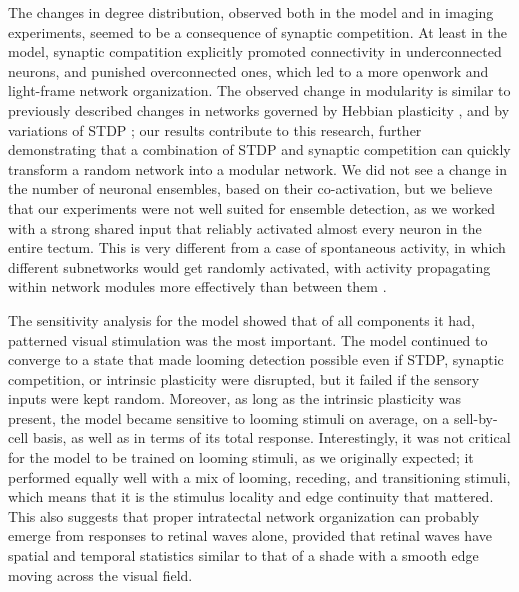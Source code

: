 \documentclass{article}
\begin{document}
The changes in degree distribution, observed both in the model and in imaging experiments, seemed to be a consequence of synaptic competition. At least in the model, synaptic compatition explicitly promoted connectivity in underconnected neurons, and punished overconnected ones, which led to a more openwork and light-frame network organization. The observed change in modularity is similar to previously described changes in networks governed by Hebbian plasticity \citep{triplett2018emergence,damicelli2018topomod}, and by variations of STDP \citep{stam2010modular}; our results contribute to this research, further demonstrating that a combination of STDP and synaptic competition can quickly transform a random network into a modular network. We did not see a change in the number of neuronal ensembles, based on their co-activation, but we believe that our experiments were not well suited for ensemble detection, as we worked with a strong shared input that reliably activated almost every neuron in the entire tectum. This is very different from a case of spontaneous activity, in which different subnetworks would get randomly activated, with activity propagating within network modules more effectively than between them \citep{avitan2017spontaneous}.

The sensitivity analysis for the model showed that of all components it had, patterned visual stimulation was the most important. The model continued to converge to a state that made looming detection possible even if STDP, synaptic competition, or intrinsic plasticity were disrupted, but it failed if the sensory inputs were kept random. Moreover, as long as the intrinsic plasticity was present, the model became sensitive to looming stimuli on average, on a sell-by-cell basis, as well as in terms of its total response. Interestingly, it was not critical for the model to be trained on looming stimuli, as we originally expected; it performed equally well with a mix of looming, receding, and transitioning stimuli, which means that it is the stimulus locality and edge continuity that mattered. This also suggests that proper intratectal network organization can probably emerge from responses to retinal waves alone, provided that retinal waves have spatial and temporal statistics similar to that of a shade with a smooth edge moving across the visual field.
\end{document}

